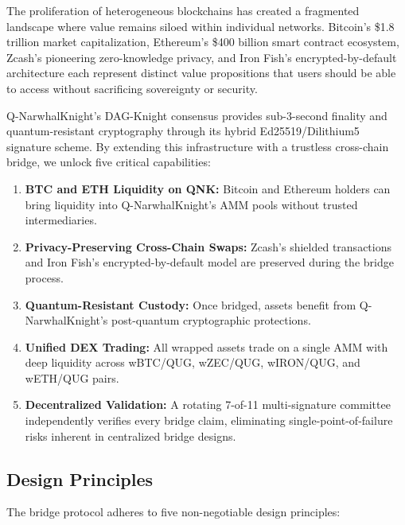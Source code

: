 \documentclass[11pt,a4paper]{article}
\begin{document}
The proliferation of heterogeneous blockchains has created a fragmented landscape where value remains siloed within individual networks. Bitcoin's \$1.8 trillion market capitalization, Ethereum's \$400 billion smart contract ecosystem, Zcash's pioneering zero-knowledge privacy, and Iron Fish's encrypted-by-default architecture each represent distinct value propositions that users should be able to access without sacrificing sovereignty or security.

Q-NarwhalKnight's DAG-Knight consensus provides sub-3-second finality and quantum-resistant cryptography through its hybrid Ed25519/Dilithium5 signature scheme. By extending this infrastructure with a trustless cross-chain bridge, we unlock five critical capabilities:

\begin{enumerate}[leftmargin=2em]
    \item \textbf{BTC and ETH Liquidity on QNK:} Bitcoin and Ethereum holders can bring liquidity into Q-NarwhalKnight's AMM pools without trusted intermediaries.
    \item \textbf{Privacy-Preserving Cross-Chain Swaps:} Zcash's shielded transactions and Iron Fish's encrypted-by-default model are preserved during the bridge process.
    \item \textbf{Quantum-Resistant Custody:} Once bridged, assets benefit from Q-NarwhalKnight's post-quantum cryptographic protections.
    \item \textbf{Unified DEX Trading:} All wrapped assets trade on a single AMM with deep liquidity across wBTC/QUG, wZEC/QUG, wIRON/QUG, and wETH/QUG pairs.
    \item \textbf{Decentralized Validation:} A rotating 7-of-11 multi-signature committee independently verifies every bridge claim, eliminating single-point-of-failure risks inherent in centralized bridge designs.
\end{enumerate}

\subsection{Design Principles}

The bridge protocol adheres to five non-negotiable design principles:
\end{document}

